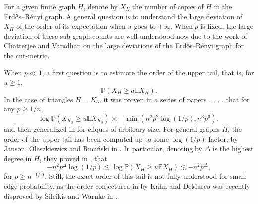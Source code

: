\documentclass[aop,preprint]{imsart}
\newcommand\PP{\mathbb{P}}
\newcommand\EE{\mathbb{E}}
\numberwithin{equation}{section}
\theoremstyle{definition}
\theoremstyle{plain}
\theoremstyle{remark}
\begin{document}
For a given finite graph $H$, denote by $X_H$ the number of copies of $H$ in the  Erd\H{o}s--R\'enyi graph. A general question is to understand the large deviation of $X_H$ of the order of its expectation when $n$ goes to $+\infty$. When $p$ is fixed, the large deviation of these sub-graph counts are well understood now due to the work of Chatterjee and Varadhan \cite{CV} on the large deviations of the  Erd\H{o}s--R\'enyi graph for the cut-metric. 

When $p\ll 1$, a first question is to estimate the order of the upper tail, that is, for $u \geq 1$,
 $$ \PP( X_H \geq u \EE X_H).$$
In the case of triangles $H = K_3$, it was proven in a series of papers \cite{Vugraph}, \cite{KV}, \cite{Chatterjeetriangle}, \cite{DK1}, that for any $p\geq 1/n$,
$$ \log \PP( X_{K_3} \geq u \EE X_{K_3})  \asymp  -\min(n^2 p^{2}\log(1/p), n^3p^3),$$
and then generalized in \cite{DK} for cliques of arbitrary size. For general graphs $H$, the order of the upper tail has been computed up to some $\log (1/p)$ factor, by Janson, Oleszkiewicz and Ruci\'{n}ski  in \cite{JOR}. In particular, denoting by $\Delta$ is the highest degree in $H$, they proved in \cite[Theorems 1.2,1.5]{JOR}, that 
$$ -n^2 p^{\Delta}\log(1/p) \lesssim  \log \PP( X_{H} \geq u \EE X_{H})  \lesssim  -n^2 p^{\Delta},$$
for $p\geq n^{-1/\Delta}$.
Still, the exact order of this tail is not fully understood for small edge-probability, as the order conjectured in \cite{DK} by Kahn and DeMarco was recently disproved by \v Sileikis and Warnke in \cite{SW}.

\end{document}
